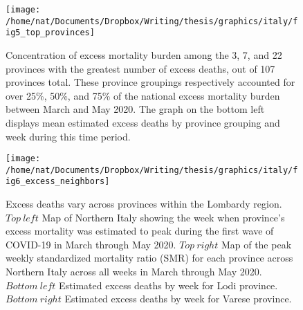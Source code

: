 \documentclass[
]{article}
\begin{document}
\begin{figure}[!ht]

{\centering \texttt{[image: /home/nat/Documents/Dropbox/Writing/thesis/graphics/italy/fig5\_top\_provinces]} 

}

\caption{Concentration of excess mortality burden among the 3, 7, and 22 provinces with the greatest number of excess deaths, out of 107 provinces total. These province groupings respectively accounted for over 25\%, 50\%, and 75\% of the national excess mortality burden between March and May 2020. The graph on the bottom left displays mean estimated excess deaths by province grouping and week during this time period.}\label{fig:top-provinces}
\end{figure}
\newpage

\begin{figure}[!ht]

{\centering \texttt{[image: /home/nat/Documents/Dropbox/Writing/thesis/graphics/italy/fig6\_excess\_neighbors]} 

}

\caption{Excess deaths vary across provinces within the Lombardy region. \(Top\ left\) Map of Northern Italy showing the week when province’s excess mortality was estimated to peak during the first wave of COVID-19 in March through May 2020. \(Top\ right\) Map of the peak weekly standardized mortality ratio (SMR) for each province across Northern Italy across all weeks in March through May 2020. \(Bottom\ left\) Estimated excess deaths by week for Lodi province. \(Bottom\ right\) Estimated excess deaths by week for Varese province.}\label{fig:excess-neighbors}
\end{figure}
\newpage
\end{document}

